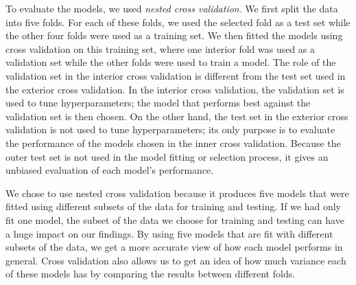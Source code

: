 \documentclass[final,onefignum,onetabnum]{siuro210301}
\begin{document}
	
	To evaluate the models, we used \textit{nested cross validation}. We first split the data into five folds. For each of these folds, we used the selected fold as a test set while the other four folds were used as a training set. We then fitted the models using cross validation on this training set, where one interior fold was used as a validation set while the other folds were used to train a model. The role of the validation set in the interior cross validation is different from the test set used in the exterior cross validation. In the interior cross validation, the validation set is used to tune hyperparameters; the model that performs best against the validation set is then chosen. On the other hand, the test set in the exterior cross validation is not used to tune hyperparameters; its only purpose is to evaluate the performance of the models chosen in the inner cross validation. Because the outer test set is not used in the model fitting or selection process, it gives an unbiased evaluation of each model's performance.
	
	We chose to use nested cross validation because it produces five models that were fitted using different subsets of the data for training and testing. If we had only fit one model, the subset of the data we choose for training and testing can have a huge impact on our findings. By using five models that are fit with different subsets of the data, we get a more accurate view of how each model performs in general. Cross validation also allows us to get an idea of how much variance each of these models has by comparing the results between different folds.
	
\end{document}
